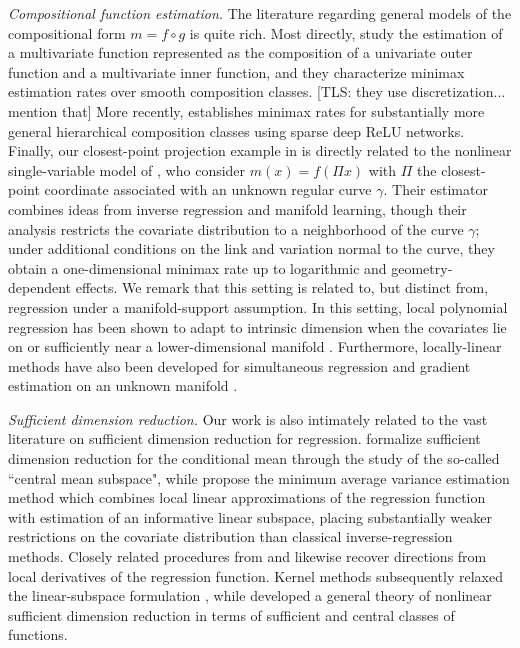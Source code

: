 \documentclass[11pt]{article}
\newcommand{\tls}[1]{{\color{cyan}[TLS: #1]}}
\begin{document}
\emph{Compositional function estimation.}
The literature regarding general models of the compositional form $m=f\circ g$ is quite rich. Most directly, \citet{juditsky2009nonparametric} study the estimation of a multivariate function represented as the composition of a univariate outer function and a multivariate inner function, and they characterize minimax estimation rates over smooth composition classes. \tls{they use discretization... mention that} More recently, \citet{Schmidt_Hieber_2020} establishes minimax rates for substantially more general hierarchical composition classes using sparse deep ReLU networks. 
Finally, our closest-point projection example in  is directly related to the nonlinear single-variable model of \citet{wu2026conditional}, who consider $m(x)=f(\Pi x)$ with $\Pi$ the closest-point coordinate associated with an unknown regular curve $\gamma$. Their estimator combines ideas from inverse regression and manifold learning, though their analysis restricts the covariate distribution to a neighborhood of the curve $\gamma$; under additional conditions on the link and variation normal to the curve, they obtain a one-dimensional minimax rate up to logarithmic and geometry-dependent effects. We remark that this setting is related to, but distinct from, regression under a manifold-support assumption. In this setting, local polynomial regression has been shown to adapt to intrinsic dimension when the covariates lie on or sufficiently near a lower-dimensional manifold \citep{bickel2007local}. Furthermore, locally-linear methods have also been developed for simultaneous regression and gradient estimation on an unknown manifold \citep{cheng2013local}. 
\medskip

\emph{Sufficient dimension reduction.}
Our work is also intimately related to the vast literature on sufficient dimension reduction for regression. \citet{cook2002dimension} formalize sufficient dimension reduction for the conditional mean through the study of the so-called ``central mean subspace", while \citet{xia2002adaptive} propose the minimum average variance estimation method which combines local linear approximations of the regression function with estimation of an informative linear subspace, placing substantially weaker restrictions on the covariate distribution than classical inverse-regression methods. Closely related procedures from \citet{xia2002adaptive} and \citet{xia2007constructive} likewise recover directions from local derivatives of the regression function. Kernel methods subsequently relaxed the linear-subspace formulation \citep{fukumizu2009kernel}, while \citet{lee2013nonlinear} developed a general theory of nonlinear sufficient dimension reduction in terms of sufficient and central classes of functions.
\end{document}
